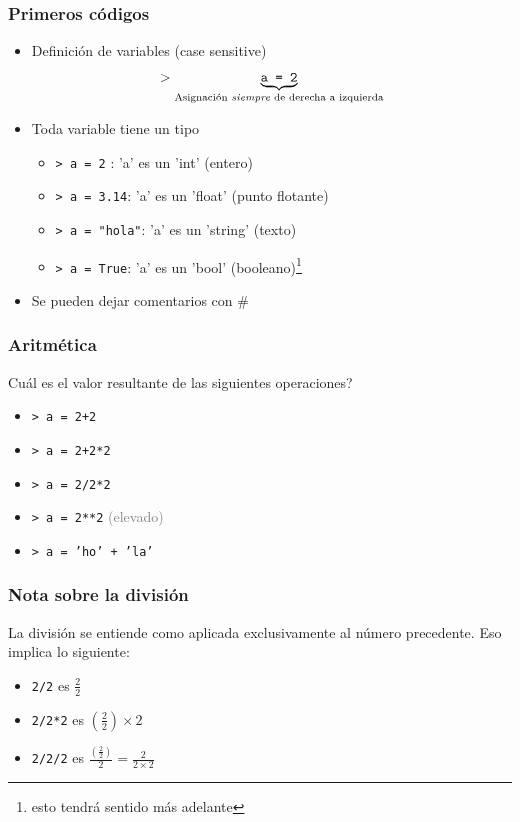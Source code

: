\documentclass[14pt,aspectratio=169,xcolor=dvipsnames]{beamer}
\begin{document}
\begin{frame}[t]\frametitle{Primeros códigos}
    \begin{itemize}
        \item Definición de variables (case sensitive)
            $$ > \underbrace{\texttt{a = 2}}_\text{Asignación \emph{siempre} de derecha a izquierda} $$
        \item Toda variable tiene un tipo 
            \begin{itemize}
                \item \texttt{> a = 2} : \hspace{0.3cm}\>\>\>\>\> 'a' es un 'int' (entero)
                \item \texttt{> a = 3.14}: \>\>\>\>\>'a' es un 'float' (punto flotante)
                \item \texttt{> a = "hola"}: 'a' es un 'string' (texto)
                \item \texttt{> a = True}: \>\>\> 'a' es un 'bool' (booleano)\footnote{esto tendrá sentido más adelante}
            \end{itemize}
        \item Se pueden dejar comentarios con \#
    \end{itemize}

\end{frame}
\begin{frame}\frametitle{Aritmética}
Cuál es el valor resultante de las siguientes operaciones? 

\vspace{1cm}
    \begin{itemize}
        \item \texttt{> a = 2+2}
        \item \texttt{> a = 2+2*2}
        \item \texttt{> a = 2/2*2}
        \item \texttt{> a = 2**2}   \textcolor{gray}{(elevado)}
        \item \texttt{> a = 'ho' + 'la'}
    \end{itemize}


\end{frame}
\begin{frame}\frametitle{Nota sobre la división}
La división se entiende como aplicada exclusivamente al número precedente. Eso implica lo siguiente: 
    \begin{itemize}
        \item \texttt{2/2} es $\frac 2 2$
        \item \texttt{2/2*2} es $\left(\frac 2 2\right) \times 2$
        \item \texttt{2/2/2} es $\frac{\left(\frac 2 2\right)}{2}= \frac{2}{2\times 2}$
    \end{itemize}

\pause {}
\end{frame}
\end{document}
